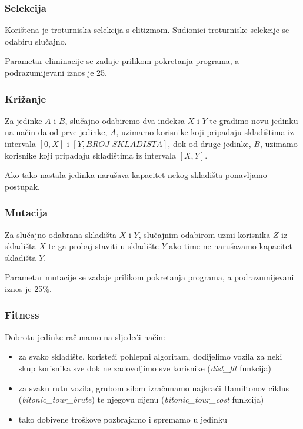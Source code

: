\documentclass[utf8]{beamer}
\begin{document}
\begin{frame}
\frametitle{Selekcija}

Korištena je troturniska selekcija s elitizmom. Sudionici troturniske selekcije se odabiru slučajno.

\vspace{5mm}

Parametar eliminacije se zadaje prilikom pokretanja programa, a podrazumijevani iznos je 25.

\end{frame}

\begin{frame}
\frametitle{Križanje}

Za jedinke $A$ i $B$, slučajno odabiremo dva indeksa $X$ i $Y$ te gradimo novu jedinku na način da od prve jedinke, $A$, uzimamo korisnike koji pripadaju skladištima iz intervala $[0, X]$ i $[Y, BROJ\_SKLADISTA]$, dok od druge jedinke, $B$, uzimamo korisnike koji pripadaju skladištima iz intervala $[X, Y]$. 

\vspace{5mm}

Ako tako nastala jedinka narušava kapacitet nekog skladišta ponavljamo postupak.

\end{frame}

\begin{frame}
\frametitle{Mutacija}

Za slučajno odabrana skladišta $X$ i $Y$, slučajnim odabirom uzmi korisnika $Z$ iz skladišta $X$ te ga probaj staviti u skladište $Y$ ako time ne narušavamo kapacitet skladišta $Y$.

\vspace{5mm}

Parametar mutacije se zadaje prilikom pokretanja programa, a podrazumijevani iznos je 25\%.

\end{frame}

\begin{frame}
\frametitle{Fitness}

Dobrotu jedinke računamo na sljedeći način:
\begin{itemize}
	\item za svako skladište, koristeći pohlepni algoritam, dodijelimo vozila za neki skup korisnika sve dok ne zadovoljimo sve korisnike (\textit{dist\_fit} funkcija)
	
	\item za svaku rutu vozila, grubom silom izračunamo najkraći Hamiltonov ciklus (\textit{bitonic\_tour\_brute}) te njegovu cijenu (\textit{bitonic\_tour\_cost} funkcija)
	
	\item tako dobivene troškove pozbrajamo i spremamo u jedinku
\end{itemize}

\end{frame}
\end{document}
